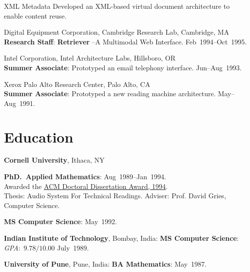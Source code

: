 \documentclass{article}
\begin{document}
\begin{compactitem}
\begin{compactdesc}
  
\item[XML Metadata] Developed an XML-based virtual document
  architecture to enable  content reuse.
\end{compactdesc}
\item   {Digital Equipment Corporation},  {Cambridge Research Lab}, Cambridge, MA\\
  \textbf{Research Staff}: \textbf{Retriever} --A Multimodal Web
  Interface.  \hfill Feb~1994--Oct~1995.
\item {Intel Corporation}, {Intel Architecture Labs},
  Hillsboro, OR\\
  \textbf{Summer Associate}: Prototyped an email telephony
  interface. \hfill Jun--Aug~1993.
\item {Xerox Palo Alto Research Center}, Palo Alto, CA\\
  \textbf{Summer Associate}: Prototyped a new reading machine
  architecture. \hfill May--Aug~1991.
\end{compactitem}

\longpage

\section*{Education}

\begin{compactitem}
\item \textbf{Cornell University}, Ithaca, NY
\begin{compactitem}
\item \textbf{PhD.\ Applied Mathematics}: \hfill
  Aug~1989--Jan~1994.\\
  \hspace*{.1in} Awarded the
\href{http://www.acm.org/awards/dd_citation/1994B.html}{%
  ACM Doctoral Dissertation Award, 1994}.\\
\hspace*{.1in} {Thesis}: {Audio System For Technical Readings}.
 {Adviser}: Prof. David Gries, Computer Science.
\item \textbf{MS Computer Science}: \hfill May~1992.
\end{compactitem}
\item \textbf{Indian Institute of Technology}, Bombay, India:
  \textbf{MS Computer Science}: \textit{GPA}:~$9.78/10.00$
  \hfill July~1989.
\item \textbf{University of Pune}, Pune, India: \textbf{BA
    Mathematics}: \hfill May~1987.
\end{compactitem}
\end{document}

